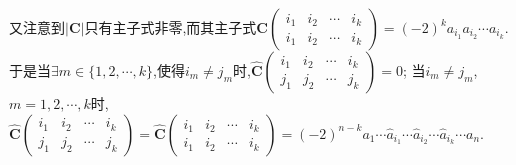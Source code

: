 \documentclass[lang=cn,newtx,10pt,scheme=chinese]{elegantbook}
\begin{document}
\begin{solution}
    又注意到\(|\boldsymbol{C}|\)只有主子式非零,而其主子式\(\boldsymbol{C}\left(\begin{matrix}
    i_1 & i_2 & \cdots & i_k\\
    i_1 & i_2 & \cdots & i_k
    \end{matrix}\right) = (-2)^ka_{i_1}a_{i_2}\cdots a_{i_k}\).
    于是当\(\exists m\in \{1,2,\cdots,k\}\),使得\(i_m\neq j_m\)时,\(\widehat{\boldsymbol{C}}\left(\begin{matrix}
    i_1 & i_2 & \cdots & i_k\\
    j_1 & j_2 & \cdots & j_k
    \end{matrix}\right) = 0\);
    当\(i_m\neq j_m\),\(m = 1,2,\cdots,k\)时,\(\widehat{\boldsymbol{C}}\left(\begin{matrix}
    i_1 & i_2 & \cdots & i_k\\
    j_1 & j_2 & \cdots & j_k
    \end{matrix}\right) = \widehat{\boldsymbol{C}}\left(\begin{matrix}
    i_1 & i_2 & \cdots & i_k\\
    i_1 & i_2 & \cdots & i_k
    \end{matrix}\right) = (-2)^{n - k}a_1\cdots \hat{a}_{i_1}\cdots \hat{a}_{i_2}\cdots \hat{a}_{i_k}\cdots a_n\).
    

\end{solution}
\end{document}
